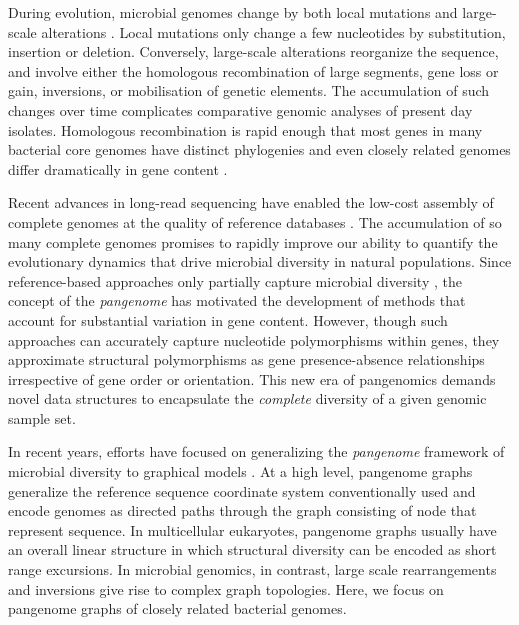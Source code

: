 \documentclass[aps,rmp,preprint,superscriptaddress,10pt,linenumbers]{revtex4-1}
\begin{document}

During evolution, microbial genomes change by both local mutations and large-scale alterations \cite{arnold2021horizontal}.
Local mutations only change a few nucleotides by substitution, insertion or deletion.
Conversely, large-scale alterations reorganize the sequence, and involve either the homologous recombination of large segments, gene loss or gain, inversions, or mobilisation of genetic elements.
The accumulation of such changes over time complicates comparative genomic analyses of present day isolates.
Homologous recombination is rapid enough that most genes in many bacterial core genomes have distinct phylogenies \cite{sakoparnig2021whole} and even closely related genomes differ dramatically in gene content \cite{touchon2020phylogenetic,touchon2009organised,doolittle2009origin}.

Recent advances in long-read sequencing have enabled the low-cost assembly of complete genomes at the quality of reference databases \cite{whibley2021changing}.
The accumulation of so many complete genomes promises to rapidly improve our ability to quantify the evolutionary dynamics that drive microbial diversity in natural populations.
Since reference-based approaches only partially capture microbial diversity \cite{tettelin2008comparative}, the concept of the \emph{pangenome} has motivated the development of methods that account for substantial variation in gene content.
However, though such approaches can accurately capture nucleotide polymorphisms within genes, they approximate structural polymorphisms as gene presence-absence relationships \cite{page2015roary,ding2018panx} irrespective of gene order or orientation.
This new era of pangenomics demands novel data structures to encapsulate the \emph{complete} diversity of a given genomic sample set.

In recent years, efforts have focused on generalizing the \emph{pangenome} framework of microbial diversity to graphical models \cite{eizenga2020pangenome}.
At a high level, pangenome graphs generalize the reference sequence coordinate system conventionally used and encode genomes as directed paths through the graph consisting of node that represent sequence.
In multicellular eukaryotes, pangenome graphs usually have an overall linear structure in which structural diversity can be encoded as short range  excursions.
In microbial genomics, in contrast, large scale rearrangements and inversions give rise to complex graph topologies.
Here, we focus on pangenome graphs of closely related bacterial genomes.
\end{document}
